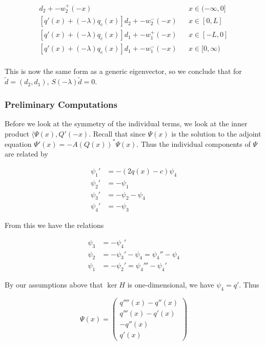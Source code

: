 \documentclass[12pt]{article}
\begin{document}
\begin{align*}
[q'(x) + (-\lambda) q_c(x)]d_2 + -w_2^+(-x) && x \in (-\infty, 0] \\
[q'(x) + (-\lambda) q_c(x)]d_2 + -w_2^-(-x) && x \in [0, L] \\
[q'(x) + (-\lambda) q_c(x)]d_1 + -w_1^+(-x) && x \in [-L, 0] \\
[q'(x) + (-\lambda) q_c(x)]d_1 + -w_1^-(-x) && x \in [0, \infty) \\
\end{align*}

This is now the same form as a generic eigenvector, so we conclude that for $\tilde{d} = (d_2, d_1)$, $S(-\lambda)\tilde{d} = 0$.\\

\subsubsection*{Preliminary Computations}

Before we look at the symmetry of the individual terms, we look at the inner product $\langle \Psi(x), Q'(-x)$. Recall that since $\Psi(x)$ is the solution to the adjoint equation $\Psi'(x) = -A(Q(x))^* \Psi(x)$. Thus the individual components of $\Psi$ are related by

\begin{align*}
\psi_1' &= -(2q(x) - c) \psi_4 \\
\psi_2' &= -\psi_1 \\
\psi_3' &= -\psi_2 - \psi_4 \\
\psi_4' &= -\psi_3
\end{align*}

From this we have the relations

\begin{align*}
\psi_3 &= -\psi_4' \\
\psi_2 &= -\psi_3' - \psi_4 = \psi_4'' - \psi_4 \\
\psi_1 &= -\psi_2' = \psi_4''' - \psi_4'
\end{align*}

By our assumptions above that $\ker H$ is one-dimensional, we have $\psi_4 = q'$. Thus

\[
\Psi(x) = \begin{pmatrix}
q''''(x) - q''(x) \\
q'''(x) - q'(x) \\
-q''(x) \\
q'(x)
\end{pmatrix}
\]
\end{document}

